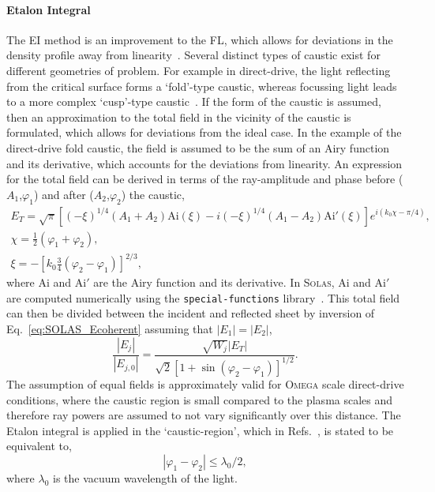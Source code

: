 \paragraph*{Etalon Integral}
The \ac{EI} method is an improvement to the \ac{FL}, which allows for deviations in the density profile away from linearity~\cite{colaitis_real_2019,kravcov_caustics_1999,kratsov_theory_2010}.
Several distinct types of caustic exist for different geometries of problem.
For example in direct-drive, the light reflecting from the critical surface forms a `fold'-type caustic, whereas focussing light leads to a more complex `cusp'-type caustic~\cite{lopez_metaplectic_2022}.
If the form of the caustic is assumed, then an approximation to the total field in the vicinity of the caustic is formulated, which allows for deviations from the ideal case.
In the example of the direct-drive fold caustic, the field is assumed to be the sum of an Airy function and its derivative, which accounts for the deviations from linearity.
An expression for the total field can be derived in terms of the ray-amplitude and phase before ($A_1$,$\varphi_1$) and after ($A_2$,$\varphi_2$) the caustic,
\begin{equation}
    \begin{gathered}
        E_T = \sqrt{\pi}\left[(-\xi)^{1/4}(A_1+A_2)\text{Ai}(\xi) - i(-\xi)^{1/4}(A_1-A_2)\text{Ai}'(\xi)  \right]e^{i(k_0\chi - \pi/4)}, \\
        \chi = \frac{1}{2}(\varphi_1+\varphi_2), \\
        \xi = -\left[ k_0\frac{3}{4}(\varphi_2-\varphi_1)  \right]^{2/3},
    \end{gathered}
\end{equation}
where $\text{Ai}$ and $\text{Ai}'$ are the Airy function and its derivative.
In \textsc{Solas}, $\text{Ai}$ and $\text{Ai}'$ are computed numerically using the \texttt{special-functions} library~\cite{chang_computation_1996}.
This total field can then be divided between the incident and reflected sheet by inversion of Eq.~\ref{eq:SOLAS_Ecoherent} assuming that $|E_1|=|E_2|$,
\begin{equation}
    \label{eq:SOLAS_etlon_int_field}
    \frac{\left|E_j\right|}{\left|E_{j, 0}\right|}=\frac{\sqrt{W_j}\left|E_T\right|}{\sqrt{2}\left[1+\sin \left(\varphi_2-\varphi_1\right)\right]^{1 / 2}}.
\end{equation}
The assumption of equal fields is approximately valid for \textsc{Omega} scale direct-drive conditions, where the caustic region is small compared to the plasma scales and therefore ray powers are assumed to not vary significantly over this distance.
The Etalon integral is applied in the `caustic-region', which in Refs.~\cite{asatryan_fresnel_1988,kravtsov_iv_1988,colaitis_real_2019}, is stated to be equivalent to,
\begin{equation}%
    \label{eq:SOLAS_causticregion}
    |\varphi_1-\varphi_2|\leq\lambda_0/2,
\end{equation}
where $\lambda_0$ is the vacuum wavelength of the light.

